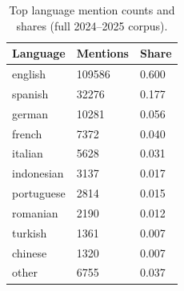 \begin{table}[H]
\centering
\caption{Top language mention counts and shares (full 2024--2025 corpus).}
\label{tab:lang_counts_full}
\begin{tabular}{lll}
\toprule
Language & Mentions & Share \\
\midrule
english & 109586 & 0.600 \\
spanish & 32276 & 0.177 \\
german & 10281 & 0.056 \\
french & 7372 & 0.040 \\
italian & 5628 & 0.031 \\
indonesian & 3137 & 0.017 \\
portuguese & 2814 & 0.015 \\
romanian & 2190 & 0.012 \\
turkish & 1361 & 0.007 \\
chinese & 1320 & 0.007 \\
other & 6755 & 0.037 \\
\bottomrule
\end{tabular}
\end{table}
